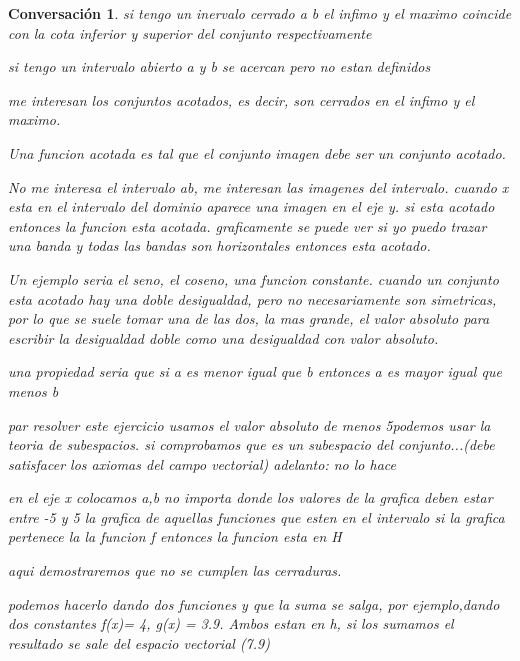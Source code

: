 \documentclass{IEEEtran}
\newtheorem{conv}{Conversaci\'{o}n}
\begin{document}
\begin{conv}

si tengo un inervalo cerrado a b el infimo y el maximo coincide con la cota inferior y superior del conjunto respectivamente

si tengo un intervalo abierto a y b se acercan pero no estan definidos

me interesan los conjuntos acotados, es decir, son cerrados en el infimo y el maximo.

Una funcion acotada es tal que el conjunto imagen debe ser un conjunto acotado.

No me interesa el intervalo ab, me interesan las imagenes del intervalo.  cuando x esta en el intervalo del dominio aparece una imagen en el eje y. si esta acotado entonces la funcion esta acotada. graficamente se puede ver si yo puedo trazar una banda y todas las bandas son horizontales entonces esta acotado.
 
Un ejemplo seria el seno, el coseno, una funcion constante.
cuando un conjunto esta acotado hay una doble desigualdad, pero no necesariamente son simetricas, por lo que se suele tomar una de las dos, la mas grande, el valor absoluto para escribir la desigualdad doble como una desigualdad con valor absoluto. 

una propiedad seria que si a es menor igual que b entonces a es mayor igual que menos b 

par resolver este ejercicio usamos el valor absoluto de menos 5podemos usar la teoria de subespacios. si comprobamos que es un subespacio del conjunto...(debe satisfacer los axiomas del campo vectorial) adelanto: no lo hace 

en el eje x colocamos a,b  no importa donde
los valores de la grafica deben estar entre -5 y 5
la grafica de aquellas funciones que esten en el intervalo 
si la grafica pertenece la la funcion f entonces la funcion esta en H

aqui demostraremos que no se cumplen las cerraduras.

podemos hacerlo dando dos funciones y que la suma se salga, por ejemplo,dando dos constantes f(x)= 4, g(x) = 3.9. Ambos estan en h, si los sumamos el resultado se sale del espacio vectorial (7.9) 


\end{conv}
\end{document}
